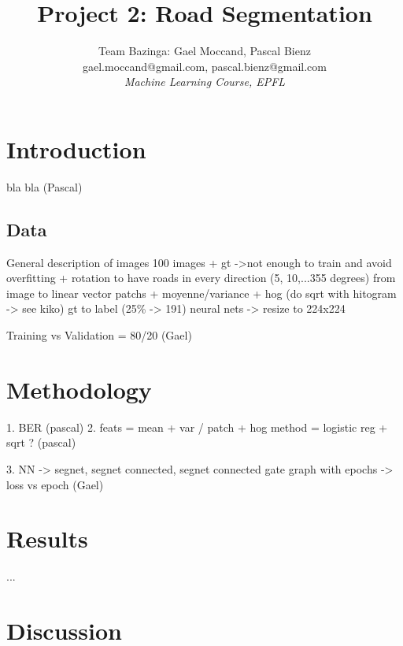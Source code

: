 \documentclass[10pt,conference,compsocconf]{IEEEtran}
\begin{document}
\title{Project 2: Road Segmentation}

\author{
  Team Bazinga:
  Gael Moccand, Pascal Bienz\\
  gael.moccand@gmail.com, pascal.bienz@gmail.com\\
  \textit{Machine Learning Course, EPFL}
}

\maketitle

\begin{abstract}

\end{abstract}

\section{Introduction}
bla bla (Pascal)
\subsection{Data}
General description of images
100 images + gt 
->not enough to train and avoid overfitting + rotation to have roads in every direction (5, 10,...355 degrees)
from image to linear vector
patchs + moyenne/variance + hog (do sqrt with hitogram -> see kiko)
gt to label (25\% -> 191)
neural nets -> resize to 224x224

Training vs Validation = 80/20
(Gael)

\section{Methodology}
1. BER (pascal)
2. feats = mean + var / patch + hog
   method = logistic reg
   + sqrt ? 
   (pascal)
   
3. NN -> segnet, segnet connected, segnet connected gate
   graph with epochs -> loss vs epoch
   (Gael)


\section{Results}
...

\section{Discussion}
\end{document}
